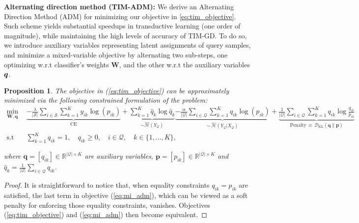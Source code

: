 \documentclass{article}
\newtheorem{prop}{Proposition}
\begin{document}
        		
    	    \textbf{Alternating direction method (TIM-ADM): }
        	    We derive an Alternating Direction Method (ADM) for minimizing our objective in \eqref{eq:tim_objective}. Such scheme yields substantial speedups in transductive learning (one order of magnitude), while maintaining the high levels of accuracy of TIM-GD. To do so, we introduce auxiliary variables representing latent assignments of query samples, and minimize a mixed-variable objective by alternating two sub-steps, one optimizing w.r.t classifier's weights $\mathbf{W}$, and the other w.r.t the auxiliary variables $\bm{q}$. 
\begin{prop}\label{prop:mi_adm}
    		        The objective in (\ref{eq:tim_objective}) can be approximately minimized via the following constrained formulation of the problem:
    		        \begin{align}\label{eq:mi_adm}
\min_{\mathbf{W}, \textbf{q}} \,\,  &\underbrace{-\frac{\lambda}{|\mathcal{S}|} \sum_{i \in \mathcal{S}}\sum_{k=1}^K y_{ik} \log (p_{ik})}_{\mathrm{CE}} + \underbrace{\sum_{k=1}^K \widehat{q}_{k}\log {\widehat{q}_{k}}}_{\sim \widehat{\mathcal{H}}(Y_\mathcal{Q}) } \underbrace{-\frac{\alpha}{|\mathcal{Q}|} \sum_{i \in \mathcal{Q}}\sum_{k=1}^K q_{ik} \log (p_{ik})}_{\sim \, \widehat{\mathcal{H}}(Y_\mathcal{Q}|X_\mathcal{Q})} + \underbrace{\frac{1}{|\mathcal{Q}|} \sum_{i \in \mathcal{Q}} \sum_{k=1}^K q_{ik}\log \frac{q_{ik}}{p_{ik}}}_{\text{Penalty} \, \equiv\, \mathcal{D}_{\mathrm{KL}}(\mathbf{q} \| \mathbf{p} )}
                        \nonumber \\
                        \text{s.t}  \quad & \sum_{k=1}^K q_{ik}=1, \quad q_{ik} \geq 0, \quad i \in \mathcal{Q}, \quad k \in \{1, \dots, K\},
    		        \end{align}
    		        
where $\textbf{q}=[q_{ik}] \in \mathbb R^{|\mathcal{Q}| \times K}$ are auxiliary variables,  $\textbf{p}=[p_{ik}] \in \mathbb R^{|\mathcal{Q}| \times K}$ and $\widehat{q}_k=\frac{1}{|\mathcal{Q}|}\sum\limits_{i \in \mathcal{Q}}q_{ik}$.
    		    \end{prop}
    		    \begin{proof}
    		    It is straightforward to notice that, when equality constraints $q_{ik} = p_{ik}$ are satisfied, the last term in objective (\ref{eq:mi_adm}), which can be viewed as a soft penalty for enforcing those equality constraints,  vanishes. Objectives (\ref{eq:tim_objective}) and (\ref{eq:mi_adm}) then become equivalent.
    		    \end{proof}
\end{document}
